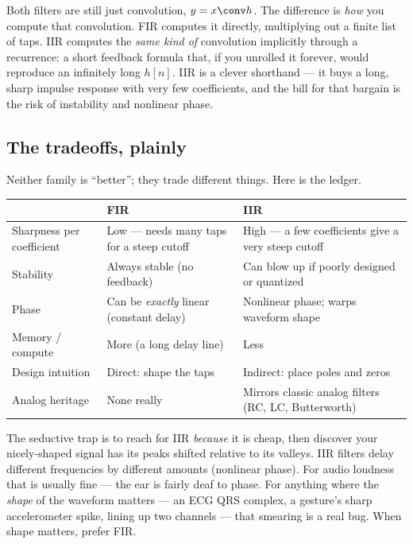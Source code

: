 \begin{happeningbox}
Both filters are still just convolution, $y = x \conv h$. The difference is
\emph{how} you compute that convolution. FIR computes it directly, multiplying out
a finite list of taps. IIR computes the \emph{same kind of} convolution
implicitly through a recurrence: a short feedback formula that, if you unrolled it
forever, would reproduce an infinitely long $h[n]$. IIR is a clever shorthand ---
it buys a long, sharp impulse response with very few coefficients, and the bill
for that bargain is the risk of instability and nonlinear phase.
\end{happeningbox}

\subsection{The tradeoffs, plainly}
\label{ch16:tradeoffs}

Neither family is ``better''; they trade different things. Here is the
ledger.

\begin{center}
\renewcommand{\arraystretch}{1.3}
\begin{tabular}{p{4.1cm} p{4.5cm} p{4.5cm}}
\toprule
 & \textbf{FIR} & \textbf{IIR} \\
\midrule
Sharpness per coefficient & Low --- needs many taps for a steep cutoff
 & High --- a few coefficients give a very steep cutoff \\
Stability & Always stable (no feedback) & Can blow up if poorly designed or
 quantized \\
Phase & Can be \emph{exactly} linear (constant delay) & Nonlinear phase; warps
 waveform shape \\
Memory / compute & More (a long delay line) & Less \\
Design intuition & Direct: shape the taps & Indirect: place poles and zeros \\
Analog heritage & None really & Mirrors classic analog filters (RC, LC,
 Butterworth) \\
\bottomrule
\end{tabular}
\end{center}

\begin{trapbox}
The seductive trap is to reach for IIR \emph{because} it is cheap, then discover
your nicely-shaped signal has its peaks shifted relative to its valleys. IIR
filters delay different frequencies by different amounts (nonlinear phase). For
audio loudness that is usually fine --- the ear is fairly deaf to phase. For
anything where the \emph{shape} of the waveform matters --- an ECG QRS complex, a
gesture's sharp accelerometer spike, lining up two channels --- that smearing is a
real bug. When shape matters, prefer FIR.
\end{trapbox}

